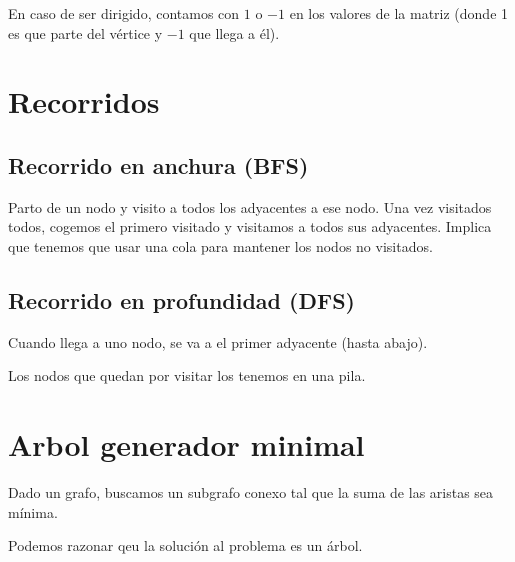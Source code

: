 En caso de ser dirigido, contamos con $1$ o $-1$ en los valores de la matriz (donde 1 es que parte del vértice y $-1$ que llega a él).

\section{Recorridos}
\subsection{Recorrido en anchura (BFS)}
Parto de un nodo y visito a todos los adyacentes a ese nodo. Una vez visitados todos, cogemos el primero visitado y visitamos a todos sus adyacentes.
Implica que tenemos que usar una cola para mantener los nodos no visitados.

\subsection{Recorrido en profundidad (DFS)}
Cuando llega a uno nodo, se va a el primer adyacente (hasta abajo).

Los nodos que quedan por visitar los tenemos en una pila.

\section{Arbol generador minimal}
Dado un grafo, buscamos un subgrafo conexo tal que la suma de las aristas sea mínima. 

Podemos razonar qeu la solución al problema es un árbol.

